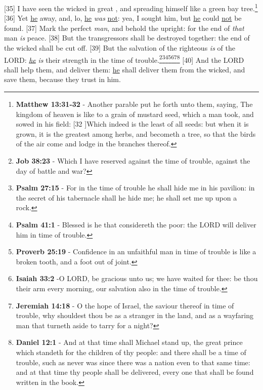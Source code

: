 [35] \textcolor[cmyk]{0.99998,1,0,0}{I have seen the wicked in great , and spreading himself like a green bay tree.}\footnote{\textbf{Matthew 13:31-32} - Another parable put he forth unto them, saying, The kingdom of heaven is like to a grain of mustard seed, which a man took, and sowed in his field: [32 ]Which indeed is the least of all seeds: but when it is grown, it is the greatest among herbs, and becometh a tree, so that the birds of the air come and lodge in the branches thereof.}
[36] \textcolor[cmyk]{0.99998,1,0,0}{Yet \underline{he}  away, and, lo, \underline{he} \emph{was} \underline{not}: yea, I sought him, but \underline{he} could \underline{not} be found.}
[37] \textcolor[cmyk]{0.99998,1,0,0}{Mark the perfect \emph{man}, and behold the upright: for the end of \emph{that} man \emph{is} peace.}
[38] \textcolor[cmyk]{0.99998,1,0,0}{But the transgressors shall be destroyed together: the end of the wicked shall be cut off.}
[39] \textcolor[cmyk]{0.99998,1,0,0}{But the salvation of the righteous \emph{is} of the LORD: \emph{\underline{he}} \emph{is} their strength in the time of trouble.}\footnote{\textbf{Job 38:23} - Which I have reserved against the time of trouble, against the day of battle and war?}\footnote{\textbf{Psalm 27:15} - For in the time of trouble he shall hide me in his pavilion: in the secret of his tabernacle shall he hide me; he shall set me up upon a rock.}\footnote{\textbf{Psalm 41:1} - Blessed is he that considereth the poor: the LORD will deliver him in time of trouble.}\footnote{\textbf{Proverb 25:19} - Confidence in an unfaithful man in time of trouble is like a broken tooth, and a foot out of joint.}\footnote{\textbf{Isaiah 33:2} -O LORD, be gracious unto us; we have waited for thee: be thou their arm every morning, our salvation also in the time of trouble.}\footnote{\textbf{Jeremiah 14:18} - O the hope of Israel, the saviour thereof in time of trouble, why shouldest thou be as a stranger in the land, and as a wayfaring man that turneth aside to tarry for a night?}\footnote{\textbf{Daniel 12:1} - And at that time shall Michael stand up, the great prince which standeth for the children of thy people: and there shall be a time of trouble, such as never was since there was a nation even to that same time: and at that time thy people shall be delivered, every one that shall be found written in the book.}
[40] \textcolor[cmyk]{0.99998,1,0,0}{And the LORD shall help them, and deliver them: \underline{he} shall deliver them from the wicked, and save them, because they trust in him.}



